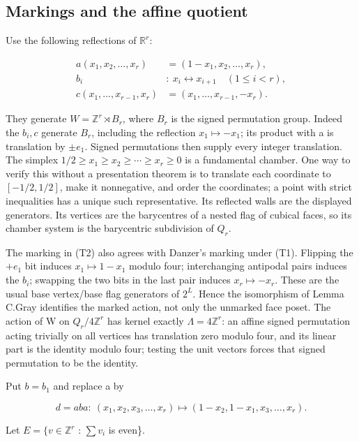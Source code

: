 \subsection{Markings and the affine
quotient}\label{markings-and-the-affine-quotient}

Use the following reflections of \(\mathbb R^r\):

\[
\begin{aligned}
a(x_1,x_2,\ldots,x_r)&=(1-x_1,x_2,\ldots,x_r),\\
b_i&:\ x_i\leftrightarrow x_{i+1}\quad(1\le i<r),\\
c(x_1,\ldots,x_{r-1},x_r)&=(x_1,\ldots,x_{r-1},-x_r).
\end{aligned}
\tag{T2}
\]

They generate \(W=\mathbb Z^r\rtimes B_r\), where \(B_r\) is the signed
permutation group. Indeed the \(b_i,c\) generate \(B_r\), including the
reflection \(x_1\mapsto -x_1\); its product with a is translation by
\(±e_1\). Signed permutations then supply every integer translation. The
simplex \(1/2\ge x_1\ge x_2\ge \cdots \ge x_r\ge 0\) is a fundamental
chamber. One way to verify this without a presentation theorem is to
translate each coordinate to \([-1/2,1/2]\), make it nonnegative, and
order the coordinates; a point with strict inequalities has a unique
such representative. Its reflected walls are the displayed generators.
Its vertices are the barycentres of a nested flag of cubical faces, so
its chamber system is the barycentric subdivision of \(Q_r\).

The marking in (T2) also agrees with Danzer's marking under (T1).
Flipping the \(+e_1\) bit induces \(x_1\mapsto 1-x_1\) modulo four;
interchanging antipodal pairs induces the \(b_i\); swapping the two bits
in the last pair induces \(x_r\mapsto -x_r\). These are the usual base
vertex/base flag generators of \(2^L\). Hence the isomorphism of Lemma
C.Gray identifies the marked action, not only the unmarked face poset.
The action of W on \(Q_r/4\mathbb Z^r\) has kernel exactly
\(\Lambda =4\mathbb Z^r\): an affine signed permutation acting trivially
on all vertices has translation zero modulo four, and its linear part is
the identity modulo four; testing the unit vectors forces that signed
permutation to be the identity.

Put \(b=b_1\) and replace a by

\[
d=aba:\ (x_1,x_2,x_3,\ldots,x_r)\mapsto(1-x_2,1-x_1,x_3,\ldots,x_r).
\tag{T3}
\]

Let \(E=\{v\in \mathbb Z^r\) : \(\sum v_i\) is even\}.


